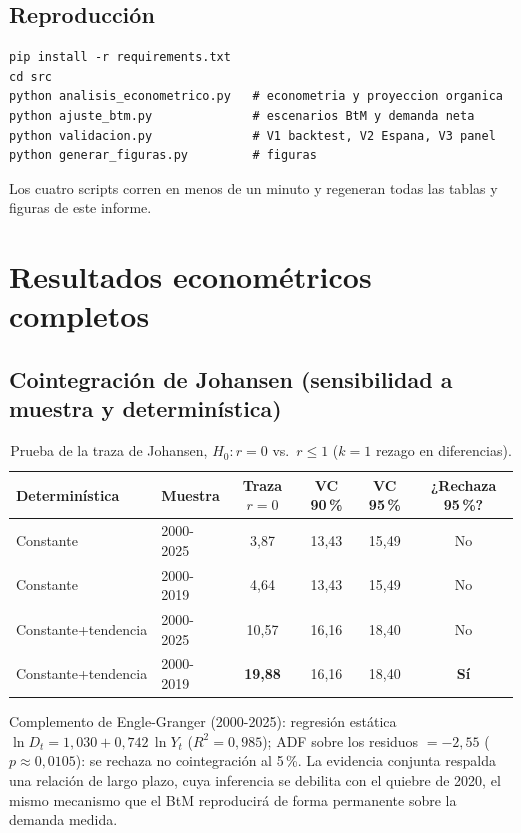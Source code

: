 \subsection{Reproducción}
\begin{verbatim}
pip install -r requirements.txt
cd src
python analisis_econometrico.py   # econometria y proyeccion organica
python ajuste_btm.py              # escenarios BtM y demanda neta
python validacion.py              # V1 backtest, V2 Espana, V3 panel
python generar_figuras.py         # figuras
\end{verbatim}
Los cuatro scripts corren en menos de un minuto y regeneran todas las tablas
y figuras de este informe.

\section{Resultados econométricos completos}

\subsection{Cointegración de Johansen (sensibilidad a muestra y determinística)}

\begin{table}[H]\centering\small
\caption{Prueba de la traza de Johansen, $H_0\!: r=0$ vs.\ $r\le1$
($k=1$ rezago en diferencias).}
\begin{tabular}{llcccc}
\toprule
Determinística & Muestra & Traza $r{=}0$ & VC 90\,\% & VC 95\,\% & ¿Rechaza 95\,\%?\\
\midrule
Constante            & 2000-2025 & 3,87  & 13,43 & 15,49 & No\\
Constante            & 2000-2019 & 4,64  & 13,43 & 15,49 & No\\
Constante+tendencia  & 2000-2025 & 10,57 & 16,16 & 18,40 & No\\
Constante+tendencia  & 2000-2019 & \textbf{19,88} & 16,16 & 18,40 & \textbf{Sí}\\
\bottomrule
\end{tabular}
\end{table}

Complemento de Engle-Granger (2000-2025): regresión estática
$\ln D_t = 1{,}030 + 0{,}742\,\ln Y_t$ ($R^2=0{,}985$); ADF sobre los
residuos $=-2{,}55$ ($p\approx0{,}0105$): se rechaza no cointegración al
5\,\%. La evidencia conjunta respalda una relación de largo plazo, cuya
inferencia se debilita con el quiebre de 2020, el mismo mecanismo que el BtM
reproducirá de forma permanente sobre la demanda medida.

